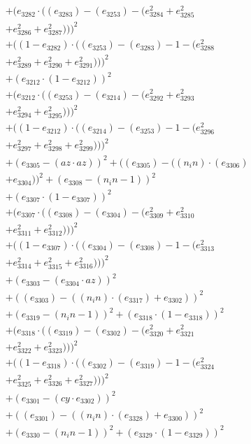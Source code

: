 \documentclass[10pt, a4paper]{article}
\begin{document}
\begin{small}
\begin{align*}
& + (e_{3282}  \cdot  ((e_{3283}) - (e_{3253}) - (e_{3284}^{2} + e_{3285}^{2} \\
& + e_{3286}^{2} + e_{3287}^{2})))^{2} \\
& + ((1 - e_{3282})  \cdot  ((e_{3253}) - (e_{3283}) - 1 - (e_{3288}^{2} \\
& + e_{3289}^{2} + e_{3290}^{2} + e_{3291}^{2})))^{2} \\
& + (e_{3212}  \cdot  (1 - e_{3212}))^{2} \\
& + (e_{3212}  \cdot  ((e_{3253}) - (e_{3214}) - (e_{3292}^{2} + e_{3293}^{2} \\
& + e_{3294}^{2} + e_{3295}^{2})))^{2} \\
& + ((1 - e_{3212})  \cdot  ((e_{3214}) - (e_{3253}) - 1 - (e_{3296}^{2} \\
& + e_{3297}^{2} + e_{3298}^{2} + e_{3299}^{2})))^{2} \\
& + (e_{3305} - (az  \cdot  az))^{2} + ((e_{3305}) - ((n_in)  \cdot  (e_{3306}) \\
& + e_{3304}))^{2} + (e_{3308} - (n_in - 1))^{2} \\
& + (e_{3307}  \cdot  (1 - e_{3307}))^{2} \\
& + (e_{3307}  \cdot  ((e_{3308}) - (e_{3304}) - (e_{3309}^{2} + e_{3310}^{2} \\
& + e_{3311}^{2} + e_{3312}^{2})))^{2} \\
& + ((1 - e_{3307})  \cdot  ((e_{3304}) - (e_{3308}) - 1 - (e_{3313}^{2} \\
& + e_{3314}^{2} + e_{3315}^{2} + e_{3316}^{2})))^{2} \\
& + (e_{3303} - (e_{3304}  \cdot  az))^{2} \\
& + ((e_{3303}) - ((n_in)  \cdot  (e_{3317}) + e_{3302}))^{2} \\
& + (e_{3319} - (n_in - 1))^{2} + (e_{3318}  \cdot  (1 - e_{3318}))^{2} \\
& + (e_{3318}  \cdot  ((e_{3319}) - (e_{3302}) - (e_{3320}^{2} + e_{3321}^{2} \\
& + e_{3322}^{2} + e_{3323}^{2})))^{2} \\
& + ((1 - e_{3318})  \cdot  ((e_{3302}) - (e_{3319}) - 1 - (e_{3324}^{2} \\
& + e_{3325}^{2} + e_{3326}^{2} + e_{3327}^{2})))^{2} \\
& + (e_{3301} - (cy  \cdot  e_{3302}))^{2} \\
& + ((e_{3301}) - ((n_in)  \cdot  (e_{3328}) + e_{3300}))^{2} \\
& + (e_{3330} - (n_in - 1))^{2} + (e_{3329}  \cdot  (1 - e_{3329}))^{2} \\

\end{align*}
\end{small}
\end{document}
